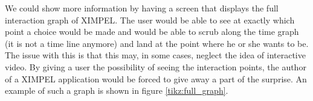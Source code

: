 We could show more information by having a screen that displays the full interaction graph of XIMPEL. The user would be able to see at exactly which point a choice would be made and would be able to scrub along the time graph (it is not a time line anymore) and land at the point where he or she wants to be. The issue with this is that this may, in some cases, neglect the idea of interactive video. By giving a user the possibility of seeing the interaction points, the author of a XIMPEL application would be forced to give away a part of the surprise. An example of such a graph is shown in figure \ref{tikz:full_graph}.

